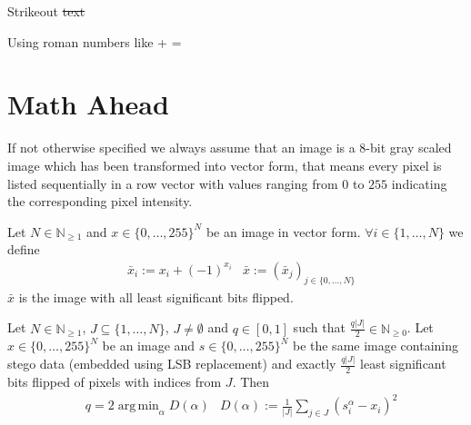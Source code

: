 \documentclass{uibk}
\DeclareMathOperator*{\argmin}{arg\,min}
\begin{document}
Strikeout \st{text}

Using roman numbers like  +  = 

\newpage

\section{Math Ahead}
\label{sec:math_ahead}

\begin{notation}
    If not otherwise specified we always assume that an image is a 8-bit gray
    scaled image which has been transformed into vector form, that means every
    pixel is listed sequentially in a row vector with values ranging from $0$
    to $255$ indicating the corresponding pixel intensity.
\end{notation}

\begin{definition}
    Let $N \in \mathbb{N}_{\ge 1}$ and $x \in \{0, \dots, 255\}^N$ be an image
    in vector form. $\forall i \in \{1, \dots, N\}$ we define
    \begin{align*}
        & \bar{x}_i := x_i + (-1)^{x_i}
        & \bar{x}   := \left(\bar{x}_j\right)_{j \in \{0, \dots, N\}}
    \end{align*}
    $\bar{x}$ is the image with all least significant bits flipped.
\end{definition}

\begin{theorem}
    \label{theo:t1_parts}
    Let $N \in \mathbb{N}_{\ge 1}$, $J \subseteq \{1, \dots, N\}$, $J \neq
    \emptyset$ and $q \in \left[0, 1\right]$ such that $\frac{q |J|}{2} \in
    \mathbb{N}_{\ge 0}$. Let $x \in \{0, \dots, 255\}^N$ be an image and $s \in
    \{0, \dots, 255\}^N$ be the same image containing stego data (embedded
    using LSB replacement) and exactly $\frac{q |J|}{2}$ least significant bits
    flipped of pixels with indices from $J$.
    Then
    \begin{align*}
        & q = 2 \argmin_\alpha D(\alpha)
        & D(\alpha) := \frac{1}{|J|} \sum\limits_{j \in J} \left(s_i^\alpha - x_i\right)^2
    \end{align*}
\end{theorem}
\end{document}
